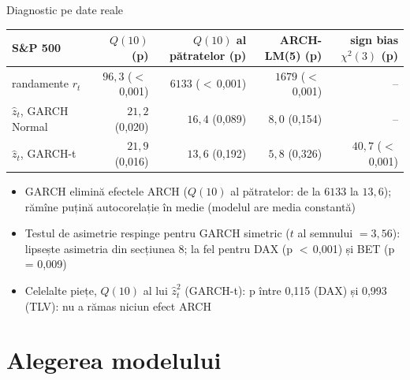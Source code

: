 \begin{frame}{Diagnostic pe date reale}
\itemsize{\footnotesize}
\begin{center}
\scriptsize
\begin{tabular}{lrrrr}
\toprule
S\&P 500 & $Q(10)$ (p) & $Q(10)$ al pătratelor (p) & ARCH-LM(5) (p) & sign bias $\chi^2(3)$ (p) \\
\midrule
randamente $r_t$ & $96{,}3$ ($<$\,0{,}001) & $6133$ ($<$\,0{,}001) & $1679$ ($<$\,0{,}001) & -- \\
$\hat z_t$, GARCH Normal & $21{,}2$ (0{,}020) & $16{,}4$ (0{,}089) & $8{,}0$ (0{,}154) & -- \\
$\hat z_t$, GARCH-t & $21{,}9$ (0{,}016) & $13{,}6$ (0{,}192) & $5{,}8$ (0{,}326) & $40{,}7$ ($<$\,0{,}001) \\
\bottomrule
\end{tabular}
\end{center}
\begin{itemize}
    \item GARCH elimină efectele ARCH ($Q(10)$ al pătratelor: de la $6133$ la $13{,}6$); rămîne puțină autocorelație în medie (modelul are media constantă)
    \item Testul de asimetrie respinge pentru GARCH simetric ($t$ al semnului $= 3{,}56$): lipsește asimetria din secțiunea 8; la fel pentru DAX (p $<$\,0{,}001) și BET (p = 0{,}009)
    \item Celelalte piețe, $Q(10)$ al lui $\hat z_t^2$ (GARCH-t): p între 0{,}115 (DAX) și 0{,}993 (TLV): nu a rămas niciun efect ARCH
\end{itemize}
\end{frame}


\section{Alegerea modelului}

